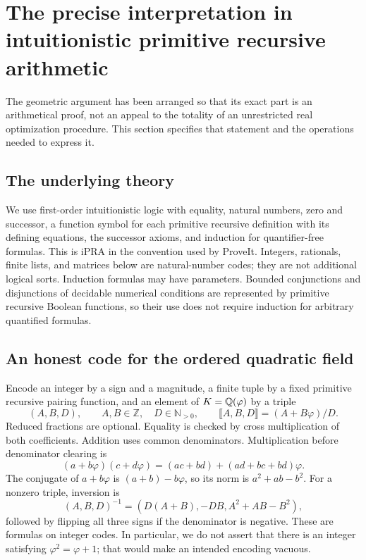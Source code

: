 \section{The precise interpretation in intuitionistic primitive recursive arithmetic}
\label{sec:arithmetic}
The geometric argument has been arranged so that its exact part is an
arithmetical proof, not an appeal to the totality of an unrestricted real
optimization procedure. This section specifies that statement and the
operations needed to express it.

\subsection{The underlying theory}
We use first-order intuitionistic logic with equality, natural numbers,
zero and successor, a function symbol for each primitive recursive
definition with its defining equations, the successor axioms, and
induction for quantifier-free formulas. This is iPRA in the convention
used by ProveIt. Integers, rationals, finite lists, and matrices below
are natural-number codes; they are not additional logical sorts.
Induction formulas may have parameters. Bounded conjunctions and
disjunctions of decidable numerical conditions are represented by
primitive recursive Boolean functions, so their use does not require
induction for arbitrary quantified formulas.

\subsection{An honest code for the ordered quadratic field}
Encode an integer by a sign and a magnitude, a finite tuple by a fixed
primitive recursive pairing function, and an element of $K=\mathbb Q(\varphi)$
by a triple
\[
 (A,B,D),\qquad A,B\in\mathbb Z,\quad D\in\mathbb N_{>0},
 \qquad \llbracket A,B,D\rrbracket=(A+B\varphi)/D.
\]
Reduced fractions are optional. Equality is checked by cross
multiplication of both coefficients. Addition uses common denominators.
Multiplication before denominator clearing is
\[
 (a+b\varphi)(c+d\varphi)=(ac+bd)+(ad+bc+bd)\varphi.
\]
The conjugate of $a+b\varphi$ is $(a+b)-b\varphi$, so its norm is
$a^2+ab-b^2$. For a nonzero triple, inversion is
\[
 (A,B,D)^{-1}
 =\left(D(A+B),-DB,A^2+AB-B^2\right),
\]
followed by flipping all three signs if the denominator is negative.
These are formulas on integer codes. In particular, we do not assert
that there is an integer satisfying $\varphi^2=\varphi+1$; that would
make an intended encoding vacuous.

